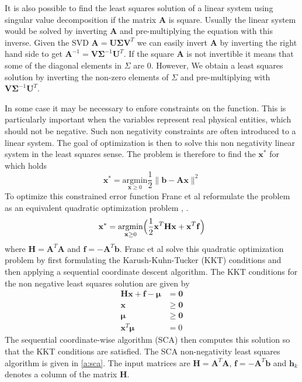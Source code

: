 \documentclass[11pt,a4paper]{report}
\begin{document}
It is also possible to find the least squares solution of a linear system using
singular value decomposition \cite{Press1992} if the matrix $\mathbf{A}$ is square. Usually the linear system would
be solved by inverting $\mathbf{A}$ and pre-multiplying the equation with this
inverse. Given the SVD $\mathbf{A} = \mathbf{U\Sigma V}^T$ we can easily invert
$\mathbf{A}$ by inverting the right hand side to get $\mathbf{A}^{-1} =
\mathbf{V\Sigma}^{-1}\mathbf{U}^T$. If the square $\mathbf{A}$ is not invertible it
means that some of the diagonal elements in $\Sigma$ are 0. However, We obtain a
least squares solution by inverting the non-zero elements of $\Sigma$ and
pre-multiplying with $\mathbf{V\Sigma}^{-1}\mathbf{U}^T$.

In some case it may be necessary to enfore constraints on the function. This is
particularly important when the variables represent real physical entities,
which should not be negative. Such non negativity constraints are often
introduced to a linear system. The goal of optimization is then to solve this
non negativity linear system in the least squares sense. The problem is
therefore to find the $\mathbf{x^*}$ for which holds
\begin{equation}\label{eq:nnls3}
\mathbf{x^*} = \underset{\mathbf{x} \ge 0}{\mathrm{argmin}} \frac{1}{2}\lVert \mathbf{b} - \mathbf{Ax} \rVert^2
\end{equation}
To optimize this constrained error function Franc et al reformulate the problem as an equivalent
quadratic optimization problem \cite{nnls}, \cite{nnls2}. 
\begin{equation}\label{eq:nnls4}
\mathbf{x^*} =  \underset{\mathbf{x} \ge 0}{\mathrm{argmin}} \Bigr( \frac{1}{2}
\mathbf{x}^T\mathbf{H}\mathbf{x} + \mathbf{x}^T\mathbf{f} \Bigl)
\end{equation}
where $\mathbf{H} = \mathbf{A}^T\mathbf{A}$ and $\mathbf{f} = -\mathbf{A}^T\mathbf{b}$.
Franc et al solve this quadratic optimization problem by first formulating the Karush-Kuhn-Tucker (KKT) conditions
and then applying a sequential coordinate descent algorithm. The KKT conditions for the non negative least squares solution are
given by
\begin{align}\label{eq:nnls5}
\mathbf{H}\mathbf{x} + \mathbf{f} - \mathbf{\mu} &= \mathbf{0}\\
\mathbf{x} &\ge \mathbf{0}\\
\mathbf{\mu} &\ge \mathbf{0}\\
\mathbf{x}^T\mathbf{\mu} &= 0
\end{align}
The sequential coordinate-wise algorithm (SCA) then computes this solution so that the
KKT conditions are satisfied. The SCA non-negativity least squares algorithm is
given in \ref{a:sca}. The input matrices are  $\mathbf{H} =
\mathbf{A}^T\mathbf{A}$, $\mathbf{f} = -\mathbf{A}^T\mathbf{b}$ and
$\mathbf{h}_k$ denotes a column of the matrix $\mathbf{H}$. 
\end{document}

